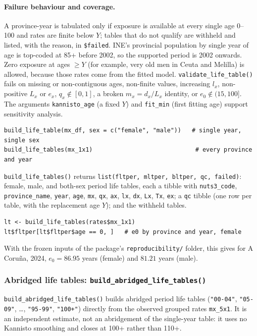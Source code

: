 \documentclass[11pt]{article}
\newcommand{\fn}[1]{\texttt{#1}}
\begin{document}
\paragraph{Failure behaviour and coverage.} A province-year is tabulated only
if exposure is available at every single age 0--100 and rates are finite
below $Y$; tables that do not qualify are withheld and listed, with the
reason, in \fn{\$failed}. INE's provincial population by single year of age
is top-coded at 85+ before 2002, so the supported period is 2002 onwards.
Zero exposure at ages $\ge Y$ (for example, very old men in Ceuta and
Melilla) is allowed, because those rates come from the fitted model.
\fn{validate\_life\_table()} fails on missing or non-contiguous ages,
non-finite values, increasing $l_x$, non-positive $L_x$ or $e_x$,
$q_x \notin [0,1]$, a broken $m_x = d_x/L_x$ identity, or
$e_0 \notin (15, 100]$. The arguments \fn{kannisto\_age} (a fixed $Y$) and
\fn{fit\_min} (first fitting age) support sensitivity analysis.

\begin{lstlisting}
build_life_table(mx_df, sex = c("female", "male"))   # single year, single sex
build_life_tables(mx_1x1)                             # every province and year
\end{lstlisting}

\fn{build\_life\_tables()} returns \fn{list(fltper, mltper, bltper, qc,
failed)}: female, male, and both-sex period life tables, each a tibble with
\fn{nuts3\_code}, \fn{province\_name}, \fn{year}, \fn{age}, \fn{mx},
\fn{qx}, \fn{ax}, \fn{lx}, \fn{dx}, \fn{Lx}, \fn{Tx}, \fn{ex}; a \fn{qc}
tibble (one row per table, with the replacement age $Y$); and the withheld
tables.

\begin{lstlisting}
lt <- build_life_tables(rates$mx_1x1)
lt$fltper[lt$fltper$age == 0, ]   # e0 by province and year, female
\end{lstlisting}

With the frozen inputs of the package's \texttt{reproducibility/} folder,
this gives for A Coru\~{n}a, 2024, $e_0 = 86.95$ years (female) and $81.21$
years (male).

\subsubsection{Abridged life tables: \fn{build\_abridged\_life\_tables()}}
\label{sec:abridged}

\fn{build\_abridged\_life\_tables()} builds abridged period life tables
(\fn{"00-04"}, \fn{"05-09"}, \dots, \fn{"95-99"}, \fn{"100+"}) directly from
the observed grouped rates \fn{mx\_5x1}. It is an independent estimate, not
an abridgement of the single-year table: it uses no Kannisto smoothing and
closes at 100+ rather than 110+.
\end{document}
